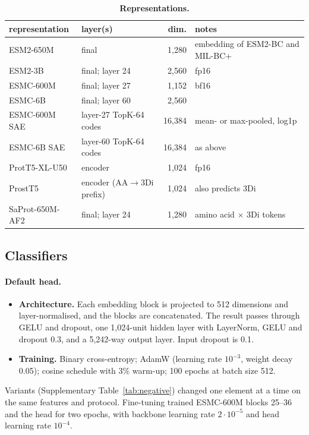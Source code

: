 \documentclass[11pt]{article}
\begin{document}
\begin{table}[t]
\centering\small
\caption{\textbf{Representations.}}
\label{tab:reps}
\footnotesize
\begin{tabular}{@{}llrl@{}}
\toprule
representation & layer(s) & dim. & notes \\
\midrule
ESM2-650M \cite{esm2} & final & 1,280 & embedding of ESM2-BC and MIL-BC+ \cite{milbc} \\
ESM2-3B \cite{esm2} & final; layer 24 & 2,560 & fp16 \\
ESMC-600M \cite{esmc} & final; layer 27 & 1,152 & bf16 \\
ESMC-6B \cite{esmc} & final; layer 60 & 2,560 & \\
ESMC-600M SAE \cite{biohubsae} & layer-27 TopK-64 codes & 16,384 & mean- or max-pooled, log1p \\
ESMC-6B SAE \cite{biohubsae} & layer-60 TopK-64 codes & 16,384 & as above \\
ProtT5-XL-U50 \cite{prottrans} & encoder & 1,024 & fp16 \\
ProstT5 \cite{prostt5} & encoder (AA$\to$3Di prefix) & 1,024 & also predicts 3Di \\
SaProt-650M-AF2 \cite{saprot} & final; layer 24 & 1,280 & amino acid $\times$ 3Di tokens \\
\bottomrule
\end{tabular}
\end{table}

\subsection{Classifiers}
\paragraph{Default head.}
\begin{itemize}
  \item \textbf{Architecture.} Each embedding block is projected to 512 dimensions and layer-normalised, and the blocks
        are concatenated. The result passes through GELU and dropout, one 1,024-unit hidden layer with LayerNorm, GELU
        and dropout 0.3, and a 5,242-way output layer. Input dropout is 0.1.
  \item \textbf{Training.} Binary cross-entropy; AdamW (learning rate $10^{-3}$, weight decay 0.05); cosine schedule
        with 3\% warm-up; 100 epochs at batch size 512.
\end{itemize}
Variants (Supplementary Table~\ref{tab:negative}) changed one element at a time on the same features and protocol.
Fine-tuning trained ESMC-600M blocks 25--36 and the head for two epochs, with backbone learning rate $2\cdot10^{-5}$
and head learning rate $10^{-4}$.
\end{document}
